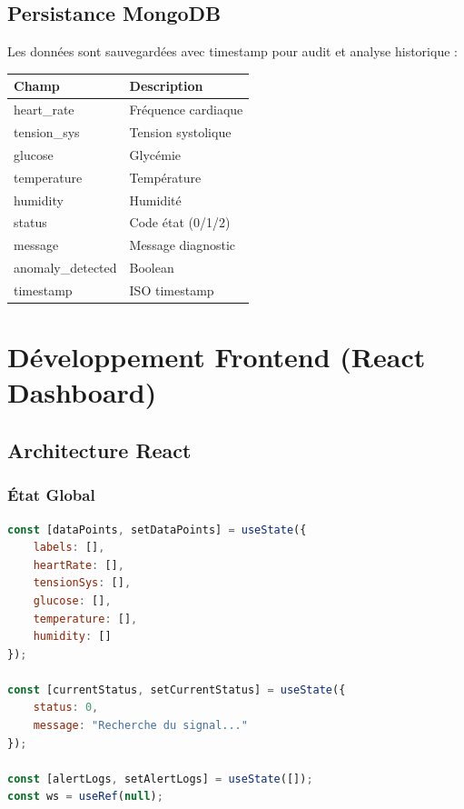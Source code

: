 \documentclass[12pt,french]{report}
\begin{document}
\section{Persistance MongoDB}

Les données sont sauvegardées avec timestamp pour audit et analyse historique :

\begin{table}[h]
\centering
\begin{tabular}{|l|l|}
\hline
\textbf{Champ} & \textbf{Description} \\
\hline
heart\_rate & Fréquence cardiaque \\
tension\_sys & Tension systolique \\
glucose & Glycémie \\
temperature & Température \\
humidity & Humidité \\
status & Code état (0/1/2) \\
message & Message diagnostic \\
anomaly\_detected & Boolean \\
timestamp & ISO timestamp \\
\hline
\end{tabular}
\end{table}

\chapter{Développement Frontend (React Dashboard)}

\section{Architecture React}

\subsection{État Global}

\begin{lstlisting}[language=JavaScript, caption=État du composant App]
const [dataPoints, setDataPoints] = useState({
    labels: [],
    heartRate: [],
    tensionSys: [],
    glucose: [],
    temperature: [],
    humidity: []
});

const [currentStatus, setCurrentStatus] = useState({
    status: 0,
    message: "Recherche du signal..."
});

const [alertLogs, setAlertLogs] = useState([]);
const ws = useRef(null);
\end{lstlisting}
\end{document}
